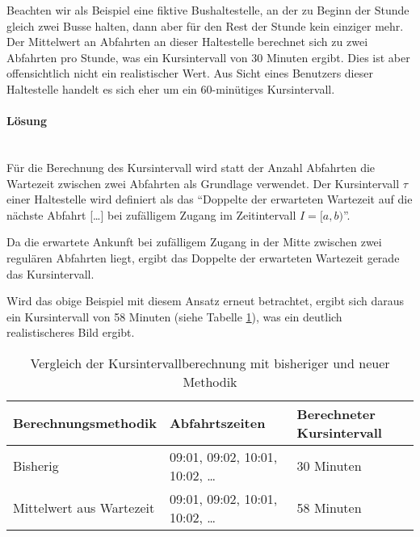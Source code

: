 Beachten wir als Beispiel eine fiktive Bushaltestelle, an der zu Beginn der Stunde gleich zwei Busse halten, dann aber für den Rest der Stunde kein einziger mehr.
Der Mittelwert an Abfahrten an dieser Haltestelle berechnet sich zu zwei Abfahrten pro Stunde, was ein Kursintervall von 30 Minuten ergibt.
Dies ist aber offensichtlich nicht ein realistischer Wert.
Aus Sicht eines Benutzers dieser Haltestelle handelt es sich eher um ein 60-minütiges Kursintervall.

\paragraph{Lösung}~\\
Für die Berechnung des Kursintervall wird statt der Anzahl Abfahrten die Wartezeit zwischen zwei Abfahrten als Grundlage verwendet.
Der Kursintervall $\tau$ einer Haltestelle wird definiert als das "`Doppelte der erwarteten Wartezeit auf die nächste Abfahrt [\ldots] bei zufälligem Zugang im Zeitintervall $I = [a,b)$"'.~\cite{visum_manual_formula}

Da die erwartete Ankunft bei zufälligem Zugang in der Mitte zwischen zwei regulären Abfahrten liegt, ergibt das Doppelte der erwarteten Wartezeit gerade das Kursintervall.

Wird das obige Beispiel mit diesem Ansatz erneut betrachtet, ergibt sich daraus ein Kursintervall von 58 Minuten (siehe Tabelle \ref{table:Vergleich der Kursintervallberechnung mit bisheriger und neuer Methodik}), was ein deutlich realistischeres Bild ergibt.

\begin{table}[ht]
    \centering
    \begin{tabular}[c]{l l l}
        \toprule
        \textbf{Berechnungsmethodik}
                                    & \textbf{Abfahrtszeiten}
                                    & \textbf{Berechneter Kursintervall}\\
        \midrule
        Bisherig
                                    & 09:01, 09:02, 10:01, 10:02, \dots
                                    & 30 Minuten\\
        Mittelwert aus Wartezeit    & 09:01, 09:02, 10:01, 10:02, \dots
                                    & 58 Minuten\\
        \bottomrule
    \end{tabular}
    \caption{Vergleich der Kursintervallberechnung mit bisheriger und neuer Methodik}
    \label{table:Vergleich der Kursintervallberechnung mit bisheriger und neuer Methodik}
\end{table}

